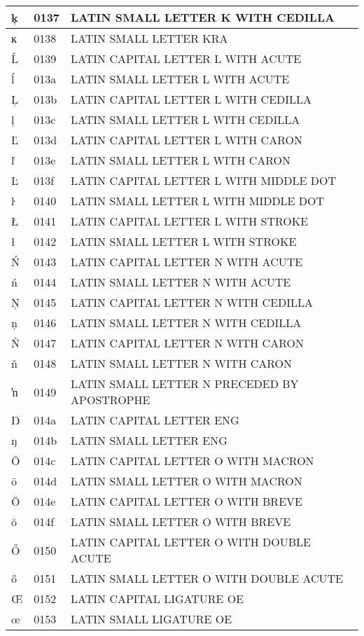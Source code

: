 \documentclass[12pt,letterpaper,openany]{book}
\begin{document}
\begin{center}
\begin{supertabular}{|m{0.25in}|m{0.5in}|m{4in}|}
ķ & 0137 & LATIN SMALL LETTER K WITH CEDILLA\\\hline
ĸ & 0138 & LATIN SMALL LETTER KRA\\\hline
Ĺ & 0139 & LATIN CAPITAL LETTER L WITH ACUTE\\\hline
ĺ & 013a & LATIN SMALL LETTER L WITH ACUTE\\\hline
Ļ & 013b & LATIN CAPITAL LETTER L WITH CEDILLA\\\hline
ļ & 013c & LATIN SMALL LETTER L WITH CEDILLA\\\hline
Ľ & 013d & LATIN CAPITAL LETTER L WITH CARON\\\hline
ľ & 013e & LATIN SMALL LETTER L WITH CARON\\\hline
Ŀ & 013f & LATIN CAPITAL LETTER L WITH MIDDLE DOT\\\hline
ŀ & 0140 & LATIN SMALL LETTER L WITH MIDDLE DOT\\\hline
Ł & 0141 & LATIN CAPITAL LETTER L WITH STROKE\\\hline
ł & 0142 & LATIN SMALL LETTER L WITH STROKE\\\hline
Ń & 0143 & LATIN CAPITAL LETTER N WITH ACUTE\\\hline
ń & 0144 & LATIN SMALL LETTER N WITH ACUTE\\\hline
Ņ & 0145 & LATIN CAPITAL LETTER N WITH CEDILLA\\\hline
ņ & 0146 & LATIN SMALL LETTER N WITH CEDILLA\\\hline
Ň & 0147 & LATIN CAPITAL LETTER N WITH CARON\\\hline
ň & 0148 & LATIN SMALL LETTER N WITH CARON\\\hline
ŉ & 0149 & LATIN SMALL LETTER N PRECEDED BY APOSTROPHE\\\hline
Ŋ & 014a & LATIN CAPITAL LETTER ENG\\\hline
ŋ & 014b & LATIN SMALL LETTER ENG\\\hline
Ō & 014c & LATIN CAPITAL LETTER O WITH MACRON\\\hline
ō & 014d & LATIN SMALL LETTER O WITH MACRON\\\hline
Ŏ & 014e & LATIN CAPITAL LETTER O WITH BREVE\\\hline
ŏ & 014f & LATIN SMALL LETTER O WITH BREVE\\\hline
Ő & 0150 & LATIN CAPITAL LETTER O WITH DOUBLE ACUTE\\\hline
ő & 0151 & LATIN SMALL LETTER O WITH DOUBLE ACUTE\\\hline
Œ & 0152 & LATIN CAPITAL LIGATURE OE\\\hline
œ & 0153 & LATIN SMALL LIGATURE OE\\\hline

\end{supertabular}
\end{center}
\end{document}
